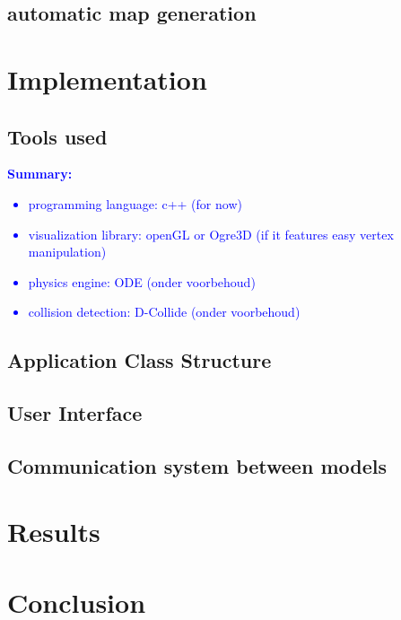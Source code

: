 \documentclass{article}
\newcommand{\inhoud}[1]{\textcolor{blue}{\textbf{\newline Summary: }\it{#1}}}
\begin{document}
\subsection{automatic map generation} 


\section{Implementation}
\subsection{Tools used}
\inhoud{ 
\begin{itemize}
\item programming language: c++ (for now)
\item visualization library: openGL or Ogre3D (if it features easy vertex manipulation) 
\item physics engine: ODE (onder voorbehoud)  
\item collision detection: D-Collide (onder voorbehoud)
\end{itemize}
}

\subsection{Application Class Structure}

\subsection{User Interface}
\subsection{Communication system between models}

\section{Results}

\section{Conclusion}

\newpage 
\end{document}
